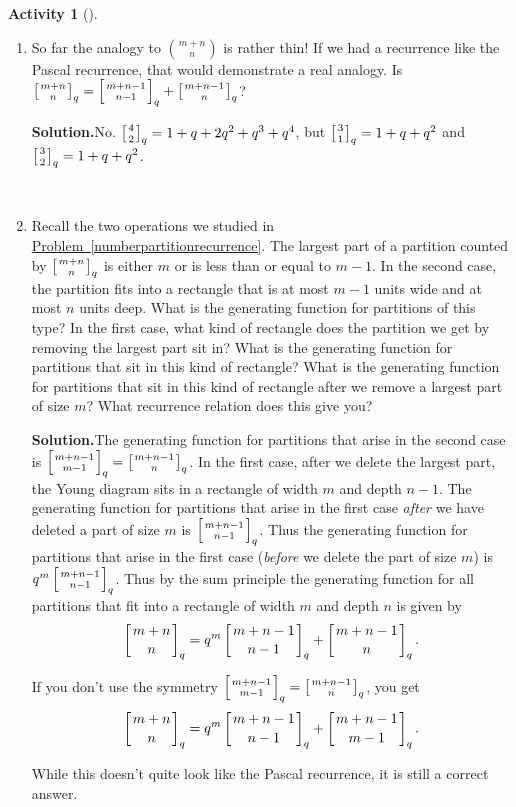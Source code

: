\documentclass[10pt,]{book}
\theoremstyle{plain}
\theoremstyle{definition}
\newtheorem{activity}[project]{Activity}
\numberwithin{equation}{chapter}
\newcommand{\qchoose}[2]{\left[{#1\atop#2}\right]_q}
\begin{document}
\begin{activity}[]
\begin{enumerate}[label=(\alph*)]
~\par
\item So far the analogy to \(\binom{m+n}{n}\) is rather thin! If we had a recurrence like the Pascal recurrence, that would demonstrate a real analogy. Is \(\qchoose{m+n}{n}= \qchoose{m+n-1}{n-1}+\qchoose{m+n-1}{n}\)?%
\par\medskip\noindent%
\textbf{Solution.}\quad No. \(\qchoose{4}{2}=1+q+2q^2+q^3+q^4\), but \(\qchoose{3}{1}=1+q+q^2\) and \(\qchoose{3}{2}=1+q+q^2\).%

~\par
\item Recall the two operations we studied in \hyperref[numberpartitionrecurrence]{Problem~\ref{numberpartitionrecurrence}}. The largest part of a partition counted by \(\qchoose{m+n}{n}\) is either \(m\) or is less than or equal to \(m-1\).  In the second case, the partition fits into a rectangle that is at most \(m-1\) units wide and at most \(n\) units deep.  What is the generating function for partitions of this type?  In the first case, what kind of rectangle does the partition we get by removing the largest part sit in?  What is the generating function for partitions that sit in this kind of rectangle?  What is the generating function for partitions that sit in this kind of rectangle after we remove a largest part of size \(m\)?  What recurrence relation does this give you?%
\par\medskip\noindent%
\textbf{Solution.}\quad The generating function for partitions that arise in the second case is \(\qchoose{m+n-1}{m-1}=\qchoose{m+n-1}{n}\). In the first case, after we delete the largest part, the Young diagram sits in a rectangle of width \(m\) and depth \(n-1\). The generating function for partitions that arise in the first case \emph{after} we have deleted a part of size \(m\) is \(\qchoose{m+n-1}{n-1}\). Thus the generating function for partitions that arise in the first case (\emph{before} we delete the part of size \(m\)) is \(q^m\qchoose{m+n-1}{n-1}\). Thus by the sum principle the generating function for all partitions that fit into a rectangle of width \(m\) and depth \(n\) is given by%
\begin{equation*}
\qchoose{m+n}{n}= q^m\qchoose{m+n-1}{n-1}+\qchoose{m+n-1}{n}.
\end{equation*}
%
\par
If you don't use the symmetry \(\qchoose{m+n-1}{m-1}=\qchoose{m+n-1}{n}\), you get%
\begin{equation*}
\qchoose{m+n}{n}= q^m\qchoose{m+n-1}{n-1}+\qchoose{m+n-1}{m-1}.
\end{equation*}
%
\par
While this doesn't {quite} look like the Pascal recurrence, it is still a correct answer.%


\end{enumerate}
\end{activity}
\end{document}
